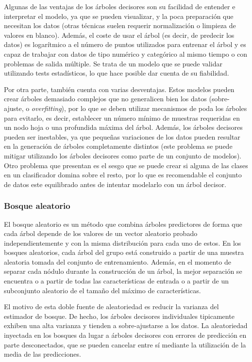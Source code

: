 Algunas de las ventajas de los árboles decisores son su facilidad de entender e interpretar el modelo, ya que se pueden visualizar, y la poca preparación que necesitan los datos (otras técnicas suelen requerir normalización o limpieza de valores en blanco).
Además, el coste de usar el árbol (es decir, de predecir los datos) es logarítmico a el número de puntos utilizados para entrenar el árbol y es capaz de trabajar con datos de tipo numérico y categórico al mismo tiempo o con problemas de salida múltiple.
Se trata de un modelo que se puede validar utilizando tests estadísticos,
lo que hace posible dar cuenta de su fiabilidad.

Por otra parte, también cuenta con varias desventajas.
Estos modelos pueden crear árboles demasiado complejos que no generalicen bien los datos (sobre-ajuste, o \emph{overfitting}), por lo que se deben utilizar mecanismos de poda los árboles para evitarlo, es decir, establecer un número mínimo de muestras requeridas en un nodo hoja o una profundida máxima del árbol.
Además, los árboles decisores pueden ser inestables, ya que pequeñas variaciones de los datos pueden resultar en la generación de árboles completamente distintos (este problema se puede mitigar utilizando los árboles decisores como parte de un conjunto de modelos).
Otro problema que presentan es el sesgo que se puede crear si alguna de las clases en un clasificador domina sobre el resto, por lo que es recomendable el conjunto de datos este equilibrado antes de intentar modelarlo con un árbol decisor.

\subsubsection{Bosque aleatorio}


El bosque aleatorio es un método que combina árboles predictores de forma que cada árbol depende de los valores de un vector aleatorio probado independientemente y con la misma distribución para cada uno de estos.
En los bosques aleatorios, cada árbol del grupo está construido a partir de una muestra aleatoria tomada del conjunto de entrenamiento.
Además, en el momento de separar cada nódulo durante la construcción de un árbol, la mejor separación se encuentra o a partir de todas las características de entrada o a partir de un subconjunto aleatorio de el tamaño del máximo de características.

El motivo de esta doble fuente de aleatoriedad es reducir la varianza del estimador de bosque.
De hecho, los árboles decisores individuales tipicamente exhiben una alta varianza y tienden a sobre-ajustarse a los datos.
La aleatoriedad inyectada en los bosques da lugar a árboles decisores con errores de predicción en parte desconectados, 
que se pueden cancelar entre sí mediante la utilización de la media de las predicciones.

